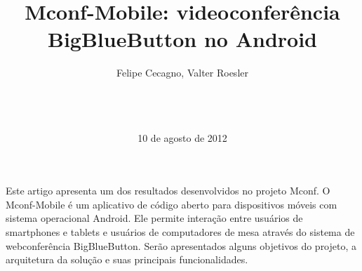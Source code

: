 \documentclass{acm_proc_article-sp}
\begin{document}
\title{Mconf-Mobile: videoconferência \\BigBlueButton no Android}
%
%
%
%
%

%
\author{
%
%
Felipe Cecagno,
Valter Roesler\\
       \\
       \\
       \\
}
\date{10 de agosto de 2012}

\maketitle
\begin{resumo}
  Este artigo apresenta um dos resultados desenvolvidos no projeto Mconf. O Mconf-Mobile é um aplicativo de código aberto para dispositivos móveis com sistema operacional Android. Ele permite interação entre usuários de smartphones e tablets e usuários de computadores de mesa através do sistema de webconferência BigBlueButton. Serão apresentados alguns objetivos do projeto, a arquitetura da solução e suas principais funcionalidades.
\end{resumo}
\end{document}
